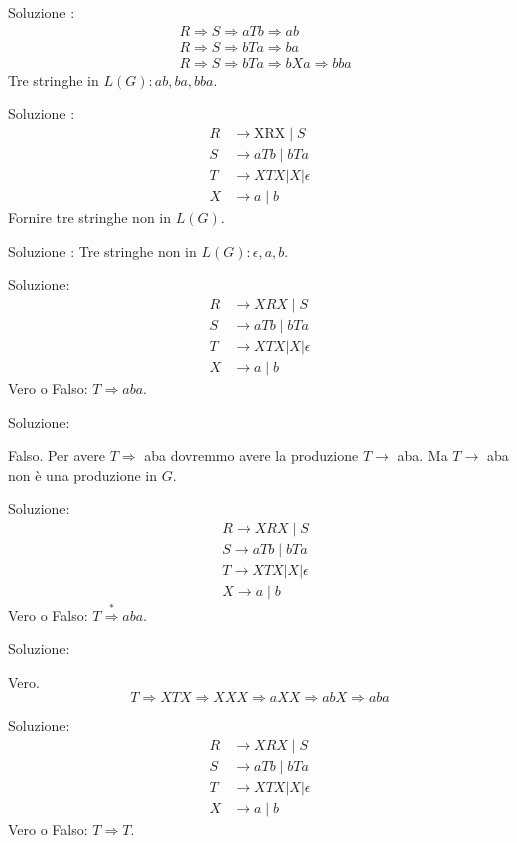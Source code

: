 Soluzione :
$$
\begin{aligned}
&R \Rightarrow S \Rightarrow a T b \Rightarrow a b \\
&R \Rightarrow S \Rightarrow b T a \Rightarrow b a \\
&R \Rightarrow S \Rightarrow b T a \Rightarrow b X a \Rightarrow b b a
\end{aligned}
$$
Tre stringhe in $L(G): a b, b a, b b a .$

Soluzione :
$$
\begin{aligned}
R & \rightarrow \mathrm{XRX} \mid S \\
S & \rightarrow a T b \mid b T a \\
T & \rightarrow X T X|X| \epsilon \\
X & \rightarrow a \mid b
\end{aligned}
$$
Fornire tre stringhe non in $L(G)$.

Soluzione :
Tre stringhe non in $L(G): \epsilon, a, b$.

Soluzione:
$$
\begin{aligned}
R & \rightarrow X R X \mid S \\
S & \rightarrow a T b \mid b T a \\
T & \rightarrow X T X|X| \epsilon \\
X & \rightarrow a \mid b
\end{aligned}
$$
Vero o Falso: $T \Rightarrow a b a .$

Soluzione:

Falso. Per avere $T \Rightarrow$ aba dovremmo avere la produzione $T \rightarrow$ aba. Ma $T \rightarrow$ aba non è una produzione in $G$.

Soluzione:
$$
\begin{aligned}
&R \rightarrow X R X \mid S \\
&S \rightarrow a T b \mid b T a \\
&T \rightarrow X T X|X| \epsilon \\
&X \rightarrow a \mid b
\end{aligned}
$$
Vero o Falso: $T \stackrel{*}{\Rightarrow} a b a .$

Soluzione:

Vero.
$$
T \Rightarrow X T X \Rightarrow X X X \Rightarrow a X X \Rightarrow a b X \Rightarrow a b a
$$

Soluzione:
$$
\begin{aligned}
R & \rightarrow X R X \mid S \\
S & \rightarrow a T b \mid b T a \\
T & \rightarrow X T X|X| \epsilon \\
X & \rightarrow a \mid b
\end{aligned}
$$
Vero o Falso: $T \Rightarrow T$.

